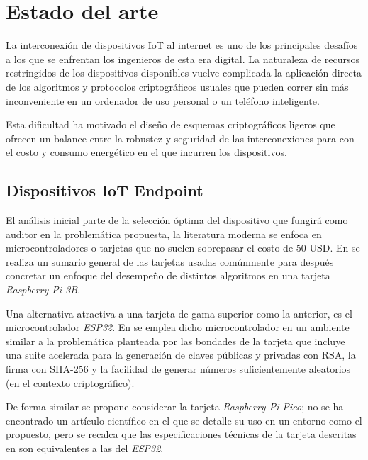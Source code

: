 \documentclass{article}
\begin{document}
    \section{Estado del arte} \label{sec:state_art}

        La interconexión de dispositivos IoT al internet es uno de los principales desafíos a los que se enfrentan los ingenieros de esta era digital. La naturaleza de recursos restringidos de los dispositivos disponibles vuelve complicada la aplicación directa de los algoritmos y protocolos criptográficos usuales que pueden correr sin más inconveniente en un ordenador de uso personal o un teléfono inteligente.

        Esta dificultad ha motivado el diseño de esquemas criptográficos ligeros que ofrecen un balance entre la robustez y seguridad de las interconexiones para con el costo y consumo energético en el que incurren los dispositivos.

        \subsection{Dispositivos IoT Endpoint}

            El análisis inicial parte de la selección óptima del dispositivo que fungirá como auditor en la problemática propuesta, la literatura moderna se enfoca en microcontroladores o tarjetas que no suelen sobrepasar el costo de 50 USD. En \cite{el2018analysis} se realiza un sumario general de las tarjetas usadas comúnmente para después concretar un enfoque del desempeño de distintos algoritmos en una tarjeta \textit{Raspberry Pi 3B}.

            Una alternativa atractiva a una tarjeta de gama superior como la anterior, es el microcontrolador \textit{ESP32}. En \cite{anand2019secure} se emplea dicho microcontrolador en un ambiente similar a la problemática planteada por las bondades de la tarjeta que incluye una suite acelerada para la generación de claves públicas y privadas con RSA, la firma con SHA-256 y la facilidad de generar números suficientemente aleatorios (en el contexto criptográfico).

            De forma similar se propone considerar la tarjeta \textit{Raspberry Pi Pico}; no se ha encontrado un artículo científico en el que se detalle su uso en un entorno como el propuesto, pero se recalca que las especificaciones técnicas de la tarjeta descritas en \cite{pico_specs} son equivalentes a las del \textit{ESP32}.
\end{document}
